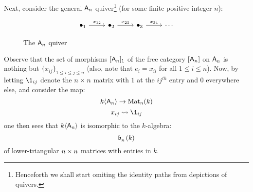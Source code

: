 \begin{example}
                Next, consider the general $\mathsf{A}_n$ quiver\footnote{Henceforth we shall start omiting the identity paths from depictions of quivers.} (for some finite positive integer $n$):
                    \begin{figure}[H]
                        \centering
                            $$
                                \begin{tikzcd}
                                	{\bullet_1} & {\bullet_2} & {\bullet_3} & \cdots
                                	\arrow["{x_{12}}", from=1-1, to=1-2]
                                	\arrow["{x_{23}}", from=1-2, to=1-3]
                                	\arrow["{x_{34}}", from=1-3, to=1-4]
                                \end{tikzcd}
                            $$
                        \caption{The $\mathsf{A}_n$ quiver}
                        \label{fig: A_n_quiver}
                    \end{figure}
                Observe that the set of morphisms $[\mathsf{A}_n]_1$ of the free category $[\mathsf{A}_n]$ on $\mathsf{A}_n$ is nothing but $\{x_{ij}\}_{1 \leq i \leq j \leq n}$ (also, note that $e_i = x_{ii}$ for all $1 \leq i \leq n$). Now, by letting $\1_{ij}$ denote the $n \x n$ matrix with $1$ at the $ij^{th}$ entry and $0$ everywhere else, and consider the map:
                    $$k\langle\mathsf{A}_n\rangle \to \mathrm{Mat}_n(k)$$
                    $$x_{ij} \mapsto \1_{ij}$$
                one then sees that $k\langle\mathsf{A}_n\rangle$ is isomorphic to the $k$-algebra:
                    $$\mathfrak{b}_n^-(k)$$
                of lower-triangular $n \x n$ matrices with entries in $k$.
            \end{example}
